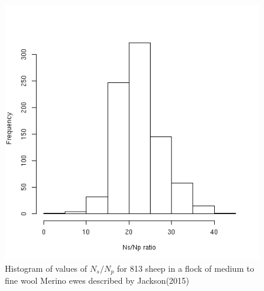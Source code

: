 %

\begin{figure}[!h]
  \centering
   \includegraphics[width=1.0\textwidth]{NsovNphist.png}
  \caption{Histogram of values of $N_{s}/N_{p}$ for 813 sheep in a flock of medium to fine wool Merino ewes described by Jackson(2015)~\cite{jack:15}}
  \label{fig:NsovNphist}
\end{figure}

%

